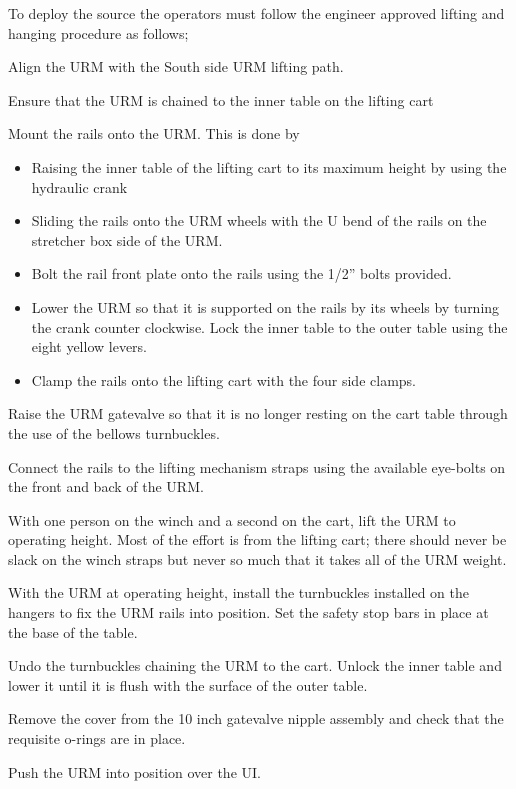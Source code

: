 \documentclass[11pt]{article}
\begin{document}
To deploy the source the operators must follow the engineer approved lifting and hanging procedure as follows;
\begin{answerlist}
\item Align the URM with the South side URM lifting path.
\item Ensure that the URM is chained to the inner table on the lifting cart
\item Mount the rails onto the URM. This is done by
  \begin{itemize}[label={$\square$}]
  \item Raising the inner table of the lifting cart to its maximum height by using the hydraulic crank
  \item Sliding the rails onto the URM wheels with the U bend of the rails on the stretcher box side of the URM.
  \item Bolt the rail front plate onto the rails using the 1/2'' bolts provided.
  \item Lower the URM so that it is supported on the rails by its wheels by turning the crank counter clockwise. Lock the inner table to the outer table using the eight yellow levers.
  \item Clamp the rails onto the lifting cart with the four side clamps.
  \end{itemize}
\item Raise the URM gatevalve so that it is no longer resting on the cart table through the use of the bellows turnbuckles. 
\item Connect the rails to the lifting mechanism straps using the available eye-bolts on the front and back of the URM.
\item With one person on the winch and a second on the cart, lift the URM to operating height. Most of the effort is from the lifting cart; there should never be slack on the winch straps but never so much that it takes all of the URM weight.
\item With the URM at operating height, install the turnbuckles installed on the hangers to fix the URM rails into position. Set the safety stop bars in place at the base of the table.
\item Undo the turnbuckles chaining the URM to the cart. Unlock the inner table and lower it until it is flush with the surface of the outer table.
\item Remove the cover from the 10 inch gatevalve nipple assembly and check that the requisite o-rings are in place.
\item Push the URM into position over the UI.

\end{answerlist}
\end{document}

